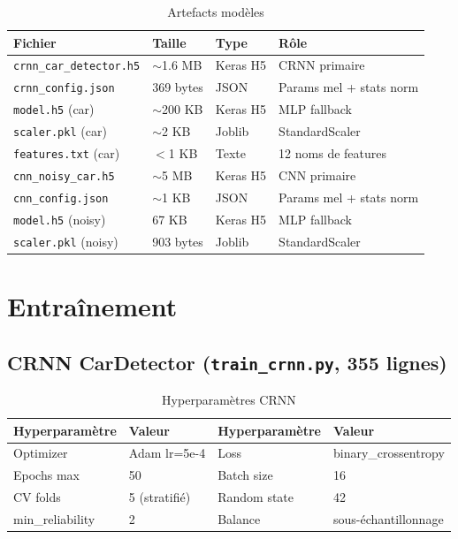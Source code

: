 \documentclass[11pt,a4paper]{article}
\newcommand{\code}[1]{\texttt{\small #1}}
\begin{document}
\begin{table}[htbp]
\centering
\begin{tabular}{@{}llll@{}}
\toprule
\textbf{Fichier} & \textbf{Taille} & \textbf{Type} & \textbf{Rôle} \\
\midrule
\code{crnn\_car\_detector.h5} & $\sim$1.6 MB & Keras H5 & CRNN primaire \\
\code{crnn\_config.json} & 369 bytes & JSON & Params mel + stats norm \\
\code{model.h5} (car) & $\sim$200 KB & Keras H5 & MLP fallback \\
\code{scaler.pkl} (car) & $\sim$2 KB & Joblib & StandardScaler \\
\code{features.txt} (car) & $<$1 KB & Texte & 12 noms de features \\
\code{cnn\_noisy\_car.h5} & $\sim$5 MB & Keras H5 & CNN primaire \\
\code{cnn\_config.json} & $\sim$1 KB & JSON & Params mel + stats norm \\
\code{model.h5} (noisy) & 67 KB & Keras H5 & MLP fallback \\
\code{scaler.pkl} (noisy) & 903 bytes & Joblib & StandardScaler \\
\bottomrule
\end{tabular}
\caption{Artefacts modèles}
\end{table}

\section{Entraînement}

\subsection{CRNN CarDetector (\texttt{train\_crnn.py}, 355 lignes)}

\begin{table}[htbp]
\centering
\begin{tabular}{@{}llll@{}}
\toprule
\textbf{Hyperparamètre} & \textbf{Valeur} & \textbf{Hyperparamètre} & \textbf{Valeur} \\
\midrule
Optimizer & Adam lr=5e-4 & Loss & binary\_crossentropy \\
Epochs max & 50 & Batch size & 16 \\
CV folds & 5 (stratifié) & Random state & 42 \\
min\_reliability & 2 & Balance & sous-échantillonnage \\
\bottomrule
\end{tabular}
\caption{Hyperparamètres CRNN}
\end{table}
\end{document}
